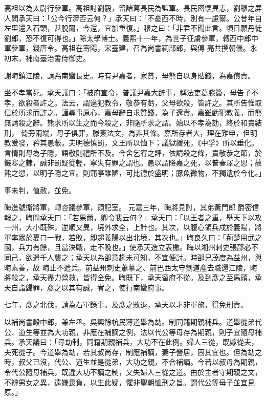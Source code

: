 \begin{pinyinscope}
 高祖以為太尉行參軍。高祖討劉毅，留諸葛長民為監軍。長民密懷異志，劉穆之屏人問承天曰：「公今行濟否云何？」承天曰：「不憂西不時，別有一慮爾。公昔年自左里還入石頭，甚脫爾，今還，宜加重復。」穆之曰：「非君不聞此言。頃日願丹徒劉郎，恐不復可得也。」除太學博士。義熙十一年，為世子征虜參軍，轉西中郎中軍參軍，錢唐令。高祖在壽陽，宋臺建，召為尚書祠部郎，與傅
 亮共撰朝儀。永初末，補南臺治書侍御史。



 謝晦鎮江陵，請為南蠻長史。時有尹嘉者，家貧，母熊自以身貼錢，為嘉償責。



 坐不孝當死。承天議曰：「被府宣令，普議尹嘉大辟事，稱法吏葛滕簽，母告子不孝，欲殺者許之。法云，謂違犯教令，敬恭有虧，父母欲殺，皆許之。其所告惟取信於所求而許之。謹尋事原心，嘉母辭自求質錢，為子還責。嘉雖虧犯教義，而熊無請殺之辭。熊求所以生之而今殺之，非隨所求之謂。始以不孝為劾，終於和賣結刑，
 倚旁兩端，母子俱罪，滕簽法文，為非其條。嘉所存者大，理在難申，但明教爰發，矜其愚蔽。夫明德慎罰，文王所以恤下；議獄緩死，《中孚》所以垂化。言情則母為子隱，語敬則禮所不及。今舍乞宥之評，依請殺之條，責敬恭之節，於饑寒之隸，誠非罰疑從輕，寧失有罪之謂也。愚以謂降嘉之死，以普春澤之恩；赦熊之愆，以明子隱之宜。則蒲亭雖陋，可比德於盛明；豚魚微物，不獨遺於今化。」



 事未判，值赦，並免。



 晦進號衛將軍，轉咨議參軍，領記室。
 元嘉三年，晦將見討，其弟黃門郎爵密信報之，晦問承天曰：「若果爾，卿令我云何？」承天曰：「以王者之重，舉天下以攻一州，大小既殊，逆順又異，境外求全，上計也。其次，以腹心領兵戍於義陽，將軍率眾於夏口一戰，若敗，即趨義陽以出北境，其次也。」晦良久曰：「荊楚用武之國，兵力有餘，且當決戰，走不晚也。」使承天造立表檄。晦以湘州刺史張邵必不同己，欲遣千人襲之；承天以為邵意趨未可知，不宜便討。時邵兄茂度為益州，與晦素善，故
 晦止不遣兵。前益州刺史蕭摹之、前巴西太守劉道產去職還江陵，晦將殺之，承天盡力營救，皆得全免。晦既下，承天留府不從。及到彥之至馬頭，承天自詣歸罪，彥之以其有誠，宥之，使行南蠻府事。



 七年，彥之北伐，請為右軍錄事。及彥之敗退，承天以才非軍旅，得免刑責。



 以補尚書殿中郎，兼左丞。吳興餘杭民薄道舉為劫。制同籍期親補兵。道舉從弟代公、道生等並為大功親，非應在補謫之例，法以代公等母存為期親，則子宜隨母補
 兵。承天議曰：「尋劫制，同籍期親補兵，大功不在此例。婦人三從，既嫁從夫，夫死從子。今道舉為劫，若其叔尚存，制應補謫，妻子營居，固其宜也。但為劫之時，叔父已沒，代公、道生並是從弟，大功之親，不合補謫。今若以叔母為期親，令代公隨母補兵，既違大功不謫之制，又失婦人三從之道。由於主者守期親之文，不辨男女之異，遠嫌畏負，以生此疑，懼非聖朝恤刑之旨。謂代公等母子並宜見原。」




\end{pinyinscope}
